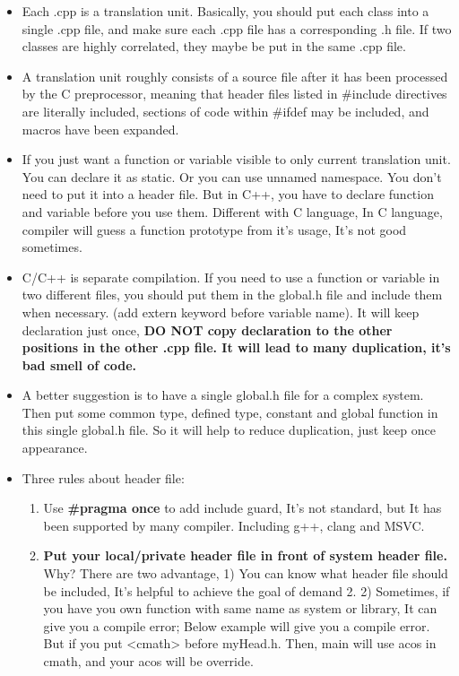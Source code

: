 \documentclass[a4paper,12pt,twoside]{book}
\begin{document}
\begin{itemize}

\item Each .cpp is a translation unit. Basically, you should put each class into a single .cpp file, and make sure each .cpp file has a corresponding .h file.  If two classes are highly correlated, they maybe be put in the same .cpp file.

\item A translation unit roughly consists of a source file after it has been processed by the C preprocessor, meaning that header files listed in \#include directives are literally included, sections of code within \#ifdef may be included, and macros have been expanded.


\item If you just want a function or variable visible to only current translation unit. You can declare it as static. Or you can use unnamed namespace.  You don't need to put it into a header file.  But in C++, you have to declare function and variable before you use them. Different with C language, In C language, compiler will guess a function prototype from it's usage, It's not good sometimes.

\item C/C++ is separate compilation. If you need to use a function or variable in two different files, you should put them in the  global.h file and include them when necessary. (add extern keyword before variable name).  It will keep declaration just once, \textbf{DO NOT copy declaration to the other positions in the other .cpp file. It will lead to many duplication, it's bad smell of code.}

\item A better suggestion is to have a single global.h file for a complex system. Then put some common type, defined type, constant and global function in this single global.h file. So it will help to reduce duplication, just keep once appearance.

\item Three rules about header file:
\begin{enumerate}
\item Use \textbf{\#pragma once} to add include guard, It's not standard, but It has been supported by many compiler. Including g++, clang and MSVC.

\item \textbf{Put your local/private header file in front of system header file. }  Why? There are two advantage, 1) You can know what header file should be included, It's helpful to achieve the goal of demand 2.  2) Sometimes, if you have you own function with same name as system or library, It can give you a compile error; Below example will give you a compile error. But if you put <cmath> before myHead.h. Then, main will use acos in cmath, and your acos will be override.


\end{enumerate}
\end{itemize}
\end{document}
